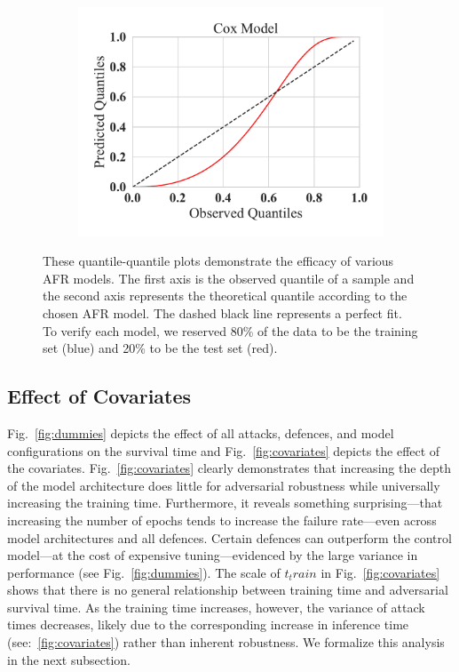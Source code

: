 \begin{figure}
\begin{subfigure}
	\end{subfigure}
	~
	\begin{subfigure}
		\centering
		\includegraphics[width=.32\textwidth]{plots/cox_qq.pdf}
	\end{subfigure}
	\caption{These quantile-quantile plots demonstrate the efficacy of various AFR models. The first axis is the observed quantile of a sample and the second axis represents the theoretical quantile according to the chosen AFR model. The dashed black line represents a perfect fit. To verify each model, we reserved 80\% of the data to be the training set (blue) and 20\% to be the test set (red). 
 }
	\label{fig:afr_models}
\end{figure}

\subsection{Effect of Covariates}
Fig.~\ref{fig:dummies} depicts the effect of all attacks, defences, and model configurations on the survival time and Fig.~\ref{fig:covariates} depicts the effect of the covariates. 
Fig.~\ref{fig:covariates} clearly demonstrates that increasing the depth of the model architecture does little for adversarial robustness while universally increasing the training time. 
Furthermore, it reveals something surprising---that increasing the number of epochs tends to increase the failure rate---even across model architectures and all defences. 
Certain defences can outperform the control model---at the cost of expensive tuning---evidenced by the large variance in performance (see Fig.~\ref{fig:dummies}). The scale of $t_train$  in Fig.~\ref{fig:covariates} shows that there is no general relationship between training time and adversarial survival time. 
As the training time increases, however, the variance of attack times decreases, likely due to the corresponding increase in inference time (see:~\ref{fig:covariates}) rather than inherent robustness.
We formalize this analysis  in the next subsection.

